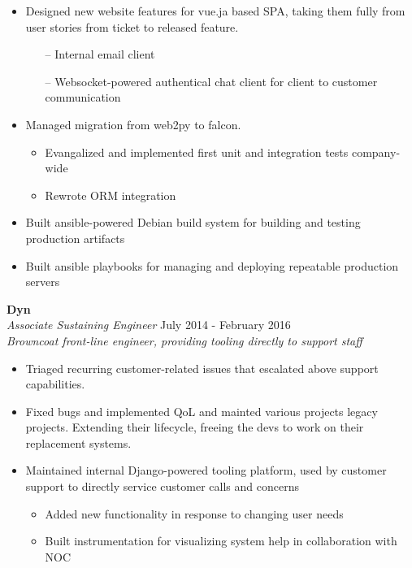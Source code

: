 \begin{minipage}[t]{\linewidth}
  \begin{itemize}
    \item Designed new website features for vue.ja based SPA, taking them fully from user stories from ticket to released feature.
      \begin{itemize}
        \item[--] Internal email client
        \item[--] Websocket-powered authentical chat client for client to customer communication
      \end{itemize}
    \item Managed migration from web2py to falcon.
      \begin{itemize}
        \item Evangalized and implemented first unit and integration tests company-wide
        \item Rewrote ORM integration
      \end{itemize}
    \item Built ansible-powered Debian build system for building and testing production artifacts
    \item Built ansible playbooks for managing and deploying repeatable production servers
  \end{itemize}
\end{minipage}

\large{\textbf{Dyn}} \\
\textit{Associate Sustaining Engineer} \hfill July 2014 - February 2016 \\[3.75pt]
\textit{Browncoat front-line engineer, providing tooling directly to support staff}

\begin{minipage}[t]{\linewidth}
  \begin{itemize}
    \item Triaged recurring customer-related issues that escalated above support capabilities.
    \item Fixed bugs and implemented QoL and mainted various projects legacy projects. Extending their lifecycle, freeing the devs to work on their replacement systems.
    \item Maintained internal Django-powered tooling platform, used by customer support to directly service customer calls and concerns
      \begin{itemize}
        \item Added new functionality in response to changing user needs
        \item Built instrumentation for visualizing system help in collaboration with NOC
      \end{itemize}
  \end{itemize}
\end{minipage}
